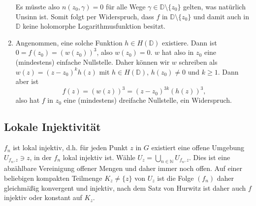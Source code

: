 \documentclass[a4paper]{article}
\begin{document}
\begin{enumerate}
\begin{equation*}
    \end{equation*}
    Es müsste also $n(z_0, \gamma) = 0$ für alle Wege $\gamma \in \mathds{D} \setminus \{z_0\}$ gelten, was natürlich Unsinn ist.
    Somit folgt per Widerspruch, dass $f$ in $\mathds{D} \setminus \{z_0\}$ und damit auch in $\mathds{D}$ keine holomorphe Logarithmusfunktion besitzt.
    \item Angenommen, eine solche Funktion $h \in H(\mathds{D})$ existiere.
    Dann ist $0 = f(z_0) = (w(z_0))^3$, also $w(z_0) = 0$.
    $w$ hat also in $z_0$ eine (mindestens) einfache Nullstelle.
    Daher können wir $w$ schreiben als $w(z) = (z-z_0)^k h(z)$ mit $h \in H(\mathds{D})$, $h(z_0) \neq 0$ und $k \geq 1$.
    Dann aber ist 
    \begin{equation*}
        f(z) = (w(z))^3 = (z-z_0)^{3k} (h(z))^3\text{,}
    \end{equation*}
    also hat $f$ in $z_0$ eine (mindestens) dreifache Nullstelle, ein Widerspruch.
\end{enumerate}


\subsection{Lokale Injektivität}

$f_n$ ist lokal injektiv, d.h. für jeden Punkt $z$ in $G$ existiert eine offene Umgebung $U_{f_n,z} \ni z$, in der $f_n$ lokal injektiv ist.
Wähle $U_z = \bigcup_{n \in \mathds{N}} U_{f_n, z}$.
Dies ist eine abzählbare Vereinigung offener Mengen und daher immer noch offen.
Auf einer beliebigen kompakten Teilmenge $K_z \neq \{z\}$ von $U_z$ ist die Folge $(f_n)$ daher gleichmäßig konvergent und injektiv, nach dem Satz von Hurwitz ist daher auch $f$ injektiv oder konstant auf $K_z$.
\end{document}
